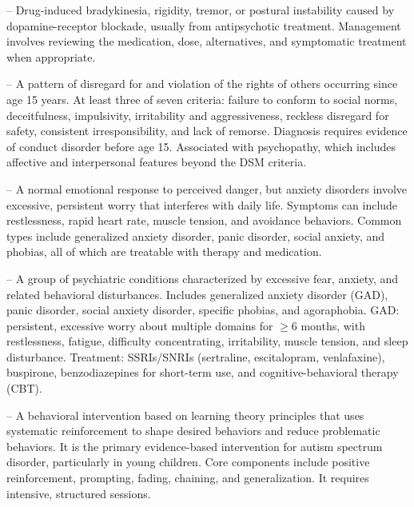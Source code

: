 -- Drug-induced bradykinesia, rigidity, tremor, or postural instability caused by dopamine-receptor blockade, usually from antipsychotic treatment. Management involves reviewing the medication, dose, alternatives, and symptomatic treatment when appropriate.

-- A pattern of disregard for and violation of the rights of others occurring since age 15 years. At least three of seven criteria: failure to conform to social norms, deceitfulness, impulsivity, irritability and aggressiveness, reckless disregard for safety, consistent irresponsibility, and lack of remorse. Diagnosis requires evidence of conduct disorder before age 15. Associated with psychopathy, which includes affective and interpersonal features beyond the DSM criteria.


-- A normal emotional response to perceived danger, but anxiety disorders involve excessive, persistent worry that interferes with daily life. Symptoms can include restlessness, rapid heart rate, muscle tension, and avoidance behaviors. Common types include generalized anxiety disorder, panic disorder, social anxiety, and phobias, all of which are treatable with therapy and medication.

-- A group of psychiatric conditions characterized by excessive fear, anxiety, and related behavioral disturbances. Includes generalized anxiety disorder (GAD), panic disorder, social anxiety disorder, specific phobias, and agoraphobia. GAD: persistent, excessive worry about multiple domains for \(\ge\)6 months, with restlessness, fatigue, difficulty concentrating, irritability, muscle tension, and sleep disturbance. Treatment: SSRIs/SNRIs (sertraline, escitalopram, venlafaxine), buspirone, benzodiazepines for short-term use, and cognitive-behavioral therapy (CBT).

-- A behavioral intervention based on learning theory principles that uses systematic reinforcement to shape desired behaviors and reduce problematic behaviors. It is the primary evidence-based intervention for autism spectrum disorder, particularly in young children. Core components include positive reinforcement, prompting, fading, chaining, and generalization. It requires intensive, structured sessions.

